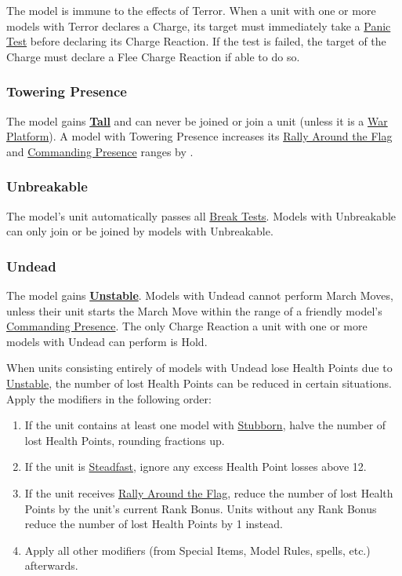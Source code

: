 The model is immune to the effects of Terror. When a unit with one or more models with Terror declares a Charge, its target must immediately take a \hyperref[panic_test]{Panic Test} before declaring its Charge Reaction. If the test is failed, the target of the Charge must declare a Flee Charge Reaction if able to do so.

\subsubsection{Towering Presence}
\idx[main=y]{\toweringpresence}\label{towering_presence}

The model gains \hyperref[tall]{\textbf{Tall}} and can never be joined or join a unit (unless it is a \hyperref[war_platform]{War Platform}). A model with Towering Presence increases its \hyperref[rally_around_the_flag]{Rally Around the Flag} and \hyperref[commanding_presence]{Commanding Presence} ranges by .

\subsubsection{Unbreakable}
\idx[main=y]{\unbreakable}\label{unbreakable}

The model's unit automatically passes all \hyperref[break_test]{Break Tests}. Models with Unbreakable can only join or be joined by models with Unbreakable.

\subsubsection{Undead}
\idx[main=y]{\undead}\label{undead}

The model gains \hyperref[unstable]{\textbf{Unstable}}. Models with Undead cannot perform March Moves, unless their unit starts the March Move within the range of a friendly model's \hyperref[commanding_presence]{Commanding Presence}. The only Charge Reaction a unit with one or more models with Undead can perform is Hold.

When units consisting entirely of models with Undead lose Health Points due to \hyperref[unstable]{Unstable}, the number of lost Health Points can be reduced in certain situations. Apply the modifiers in the following order:
\begin{enumerate}
\item If the unit contains at least one model with \hyperref[stubborn]{Stubborn}, halve the number of lost Health Points, rounding fractions up.
\item If the unit is \hyperref[steadfast]{Steadfast}, ignore any excess Health Point losses above 12.
\item If the unit receives \hyperref[rally_around_the_flag]{Rally Around the Flag}, reduce the number of lost Health Points by the unit's current Rank Bonus. Units without any Rank Bonus reduce the number of lost Health Points by 1 instead.
\item Apply all other modifiers (from Special Items, Model Rules, spells, etc.) afterwards.
\end{enumerate}

